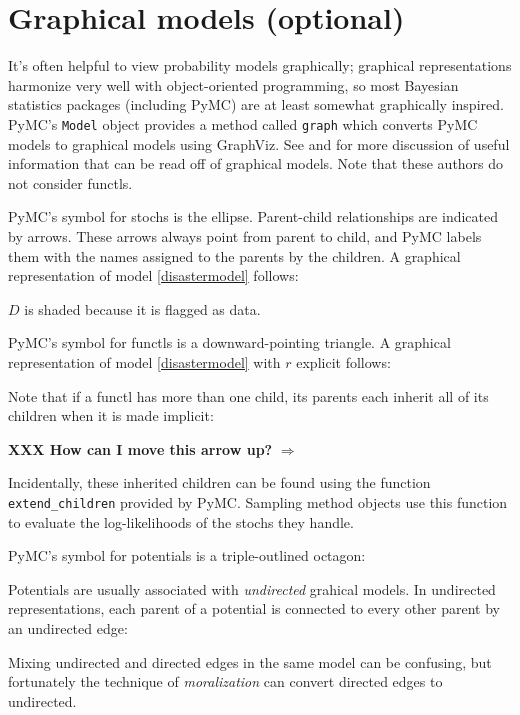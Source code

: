 \section{Graphical models (optional)}
\label{sec:graphical}

It's often helpful to view probability models graphically; graphical representations harmonize very well with object-oriented programming, so most Bayesian statistics packages (including PyMC) are at least somewhat graphically inspired. PyMC's \texttt{Model} object provides a method called \texttt{graph} which converts PyMC models to graphical models using GraphViz. See \cite{dawidmarkov} and \cite{jordangraphical} for more discussion of useful information that can be read off of graphical models. Note that these authors do not consider functls.

PyMC's symbol for stochs is the ellipse. Parent-child relationships are indicated by arrows. These arrows always point from parent to child, and PyMC labels them with the names assigned to the parents by the children. A graphical representation of model \ref{disastermodel} follows:
\begin{center}
\end{center} 
$D$ is shaded because it is flagged as data.

PyMC's symbol for functls is a downward-pointing triangle. A graphical representation of model \ref{disastermodel} with $r$ explicit follows:
\begin{center}
\end{center}
Note that if a functl has more than one child, its parents each inherit all of its children when it is made implicit:
\begin{center}
     \textbf{XXX How can I move this arrow up?} $\Rightarrow$ 
\end{center}
Incidentally, these inherited children can be found using the function \texttt{extend\_children} provided by PyMC. Sampling method objects use this function to evaluate the log-likelihoods of the stochs they handle.

PyMC's symbol for potentials is a triple-outlined octagon:
\begin{center}
\end{center}
Potentials are usually associated with \emph{undirected} grahical models. In undirected representations, each parent of a potential is connected to every other parent by an undirected edge:
\begin{center}
\end{center}
Mixing undirected and directed edges in the same model can be confusing, but fortunately the technique of \emph{moralization} can convert directed edges to undirected.

